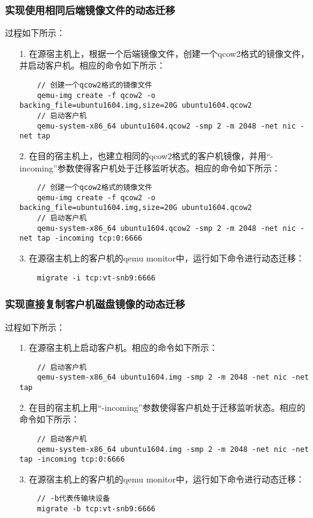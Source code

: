 \documentclass[a4paper,left=2.5cm,right=2.5cm,11pt]{article}
\begin{document}
\subsubsection{实现使用相同后端镜像文件的动态迁移}
	过程如下所示：
	\begin{itemize}
		\item[1.] 在源宿主机上，根据一个后端镜像文件，创建一个qcow2格式的镜像文件，并启动客户机。相应的命令如下所示：
		\begin{lstlisting}
	// 创建一个qcow2格式的镜像文件
	qemu-img create -f qcow2 -o backing_file=ubuntu1604.img,size=20G ubuntu1604.qcow2
	// 启动客户机
	qemu-system-x86_64 ubuntu1604.qcow2 -smp 2 -m 2048 -net nic -net tap
		\end{lstlisting}

		\item[2.] 在目的宿主机上，也建立相同的qcow2格式的客户机镜像，并用“-incoming”参数使得客户机处于迁移监听状态。相应的命令如下所示：
		\begin{lstlisting}
	// 创建一个qcow2格式的镜像文件
	qemu-img create -f qcow2 -o backing_file=ubuntu1604.img,size=20G ubuntu1604.qcow2
	// 启动客户机
	qemu-system-x86_64 ubuntu1604.qcow2 -smp 2 -m 2048 -net nic -net tap -incoming tcp:0:6666
		\end{lstlisting}

		\item[3.] 在源宿主机上的客户机的qemu monitor中，运行如下命令进行动态迁移：
		\begin{lstlisting}
	migrate -i tcp:vt-snb9:6666
		\end{lstlisting}
	\end{itemize}

\subsubsection{实现直接复制客户机磁盘镜像的动态迁移}
	过程如下所示：
	\begin{itemize}
		\item[1.] 在源宿主机上启动客户机。相应的命令如下所示：
		\begin{lstlisting}
	// 启动客户机
	qemu-system-x86_64 ubuntu1604.img -smp 2 -m 2048 -net nic -net tap
		\end{lstlisting}

		\item[2.] 在目的宿主机上用“-incoming”参数使得客户机处于迁移监听状态。相应的命令如下所示：
		\begin{lstlisting}
	// 启动客户机
	qemu-system-x86_64 ubuntu1604.img -smp 2 -m 2048 -net nic -net tap -incoming tcp:0:6666
		\end{lstlisting}

		\item[3.] 在源宿主机上的客户机的qemu monitor中，运行如下命令进行动态迁移：
		\begin{lstlisting}
	// -b代表传输块设备
	migrate -b tcp:vt-snb9:6666
		\end{lstlisting}
	\end{itemize}
\end{document}
